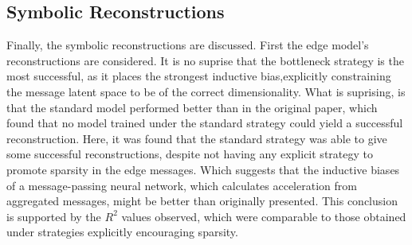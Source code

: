 \documentclass[11pt]{article}
\begin{document}
\subsection{Symbolic Reconstructions}
Finally, the symbolic reconstructions are discussed. First the edge model's reconstructions are considered. It is no suprise that the bottleneck strategy is the most successful, as it places the strongest inductive bias,explicitly constraining the message latent space to be of the correct dimensionality. What is suprising, is that the standard model performed better than in the original paper, which found that no model trained under the standard strategy could yield a successful reconstruction. Here, it was found that the standard strategy was able to give some successful reconstructions, despite not having any explicit strategy to promote sparsity in the edge messages. Which suggests that the inductive biases of a message-passing neural network, which calculates acceleration from aggregated messages, might be better than originally presented. This conclusion is supported by the $R^2$ values observed, which were comparable to those obtained under strategies explicitly encouraging sparsity.
\end{document}
